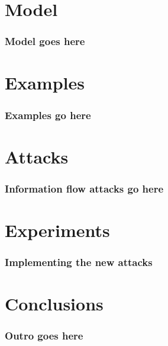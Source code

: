 \documentclass{beamer}
\begin{document}
\section{Model}
\begin{frame}
  \frametitle{Model goes here}
\end{frame}

\section{Examples}
\begin{frame}
  \frametitle{Examples go here}
\end{frame}

\section{Attacks}
\begin{frame}
  \frametitle{Information flow attacks go here}
\end{frame}

\section{Experiments}
\begin{frame}
  \frametitle{Implementing the new attacks}
\end{frame}

\section{Conclusions}
\begin{frame}
  \frametitle{Outro goes here}
\end{frame}
\end{document}
